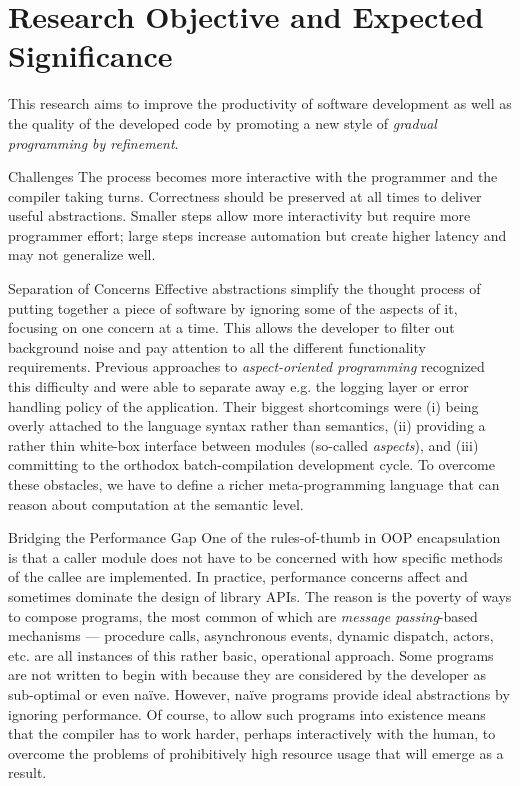 \section{Research Objective and Expected Significance}

This research aims to improve the productivity of software development
as well as the quality of the developed code by promoting a new style
of \emph{gradual programming by refinement}.

\begin{paragraph}{Challenges}
The process becomes more interactive with the programmer and the
compiler taking turns. Correctness should be preserved at all times
to deliver useful abstractions.
Smaller steps allow more interactivity but require more programmer
effort; large steps increase automation but create higher latency
and may not generalize well.
\end{paragraph}

\begin{paragraph}{Separation of Concerns}
Effective abstractions simplify the thought process of putting together
a piece of software by ignoring some of the aspects of it, focusing on
one concern at a time. This allows the developer to filter out background
noise and pay attention to all the different functionality requirements.
Previous approaches to \emph{aspect-oriented programming} recognized this
difficulty and were able to separate away e.g. the logging layer or error
handling policy of the application. Their biggest shortcomings were 
(i) being overly attached to the language syntax rather than semantics, 
(ii) providing a rather thin white-box interface between modules
    (so-called \emph{aspects}), and
(iii) committing to the orthodox batch-compilation development cycle.
To overcome these obstacles, we have to define a richer meta-programming
language that can reason about computation at the semantic level.
\end{paragraph}

\begin{paragraph}{Bridging the Performance Gap}
One of the rules-of-thumb in OOP encapsulation is that a caller module
does not have to be concerned with how specific methods of the callee are
implemented. In practice, performance concerns affect and sometimes dominate
the design of library APIs.
The reason is the poverty of ways to compose programs, the most common of
which are \emph{message passing}-based mechanisms --- procedure calls,
asynchronous events, dynamic dispatch, actors, etc. are all instances of
this rather basic, operational approach.
Some programs are not written to begin with because they are considered
by the developer as sub-optimal or even na\"ive.
However, na\"ive programs provide ideal abstractions by ignoring performance.
Of course, to allow such programs into existence means that the compiler
has to work harder, perhaps interactively with the human, to overcome the
problems of prohibitively high resource usage that will emerge as a result.
\end{paragraph}

